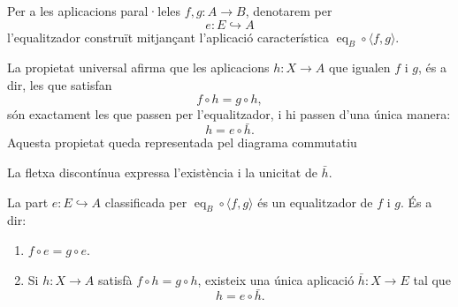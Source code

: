 \begin{notacio}\label{not:equalitzador}
Per a les aplicacions paral·leles \(f,g:A\to B\), denotarem per
\[
e:E\hookrightarrow A
\]
l'equalitzador construït mitjançant l'aplicació característica \(\operatorname{eq}_B\circ\langle f,g\rangle\).

La propietat universal afirma que les aplicacions \(h:X\to A\) que igualen \(f\) i \(g\), és a dir, les que satisfan
\[
f\circ h=g\circ h,
\]
són exactament les que passen per l'equalitzador, i hi passen d'una única manera:
\[
h=e\circ\bar h.
\]
Aquesta propietat queda representada pel diagrama commutatiu
\begin{center}
\end{center}
La fletxa discontínua expressa l'existència i la unicitat de \(\bar h\).
\end{notacio}

\begin{teorema}\label{teo:equalitzador-universal}
La part \(e:E\hookrightarrow A\) classificada per \(\operatorname{eq}_B\circ\langle f,g\rangle\) és un equalitzador de \(f\) i \(g\). És a dir:
\begin{enumerate}
\item \(f\circ e=g\circ e\).
\item Si \(h:X\to A\) satisfà \(f\circ h=g\circ h\), existeix una única aplicació \(\bar h:X\to E\) tal que
\[
h=e\circ\bar h.
\]
\end{enumerate}
\end{teorema}

